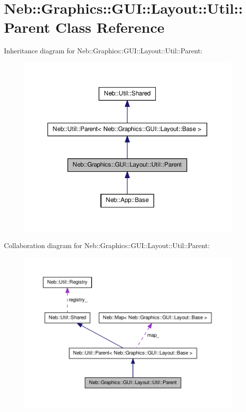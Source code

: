 \hypertarget{classNeb_1_1Graphics_1_1GUI_1_1Layout_1_1Util_1_1Parent}{\section{\-Neb\-:\-:\-Graphics\-:\-:\-G\-U\-I\-:\-:\-Layout\-:\-:\-Util\-:\-:\-Parent \-Class \-Reference}
\label{classNeb_1_1Graphics_1_1GUI_1_1Layout_1_1Util_1_1Parent}
}


\-Inheritance diagram for \-Neb\-:\-:\-Graphics\-:\-:\-G\-U\-I\-:\-:\-Layout\-:\-:\-Util\-:\-:\-Parent\-:\nopagebreak
\begin{figure}[H]
\begin{center}
\leavevmode
\includegraphics[width=338pt]{classNeb_1_1Graphics_1_1GUI_1_1Layout_1_1Util_1_1Parent__inherit__graph}
\end{center}
\end{figure}


\-Collaboration diagram for \-Neb\-:\-:\-Graphics\-:\-:\-G\-U\-I\-:\-:\-Layout\-:\-:\-Util\-:\-:\-Parent\-:\nopagebreak
\begin{figure}[H]
\begin{center}
\leavevmode
\includegraphics[width=350pt]{classNeb_1_1Graphics_1_1GUI_1_1Layout_1_1Util_1_1Parent__coll__graph}
\end{center}
\end{figure}
